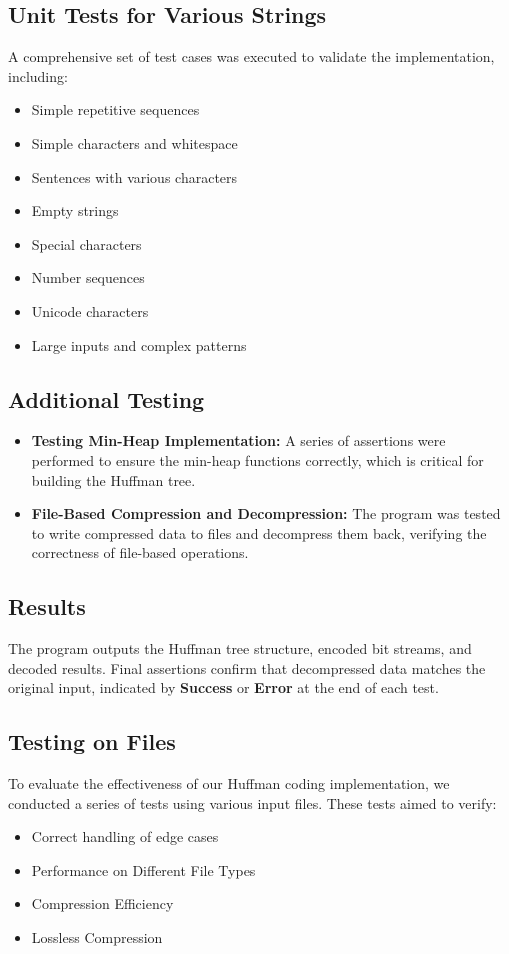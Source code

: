\documentclass[12pt,oneside,letterpaper,english]{article}
\begin{document}
\subsection*{Unit Tests for Various Strings}
A comprehensive set of test cases was executed to validate the implementation, including:
\begin{itemize}
    \item Simple repetitive sequences
    \item Simple characters and whitespace
    \item Sentences with various characters
    \item Empty strings
    \item Special characters
    \item Number sequences
    \item Unicode characters
    \item Large inputs and complex patterns
\end{itemize}

\subsection*{Additional Testing}
\begin{itemize}
    \item \textbf{Testing Min-Heap Implementation:} A series of assertions were performed to ensure the min-heap functions correctly, which is critical for building the Huffman tree.
    \item \textbf{File-Based Compression and Decompression:} The program was tested to write compressed data to files and decompress them back, verifying the correctness of file-based operations.
\end{itemize}

\subsection*{Results}
The program outputs the Huffman tree structure, encoded bit streams, and decoded results. Final assertions confirm that decompressed data matches the original input, indicated by \textbf{Success} or \textbf{Error} at the end of each test.

\subsection*{Testing on Files}
To evaluate the effectiveness of our Huffman coding implementation, we conducted a series of tests using various input files. These tests aimed to verify:
\begin{itemize}
    \item Correct handling of edge cases
    \item Performance on Different File Types
    \item Compression Efficiency
    \item Lossless Compression
\end{itemize}
\end{document}
